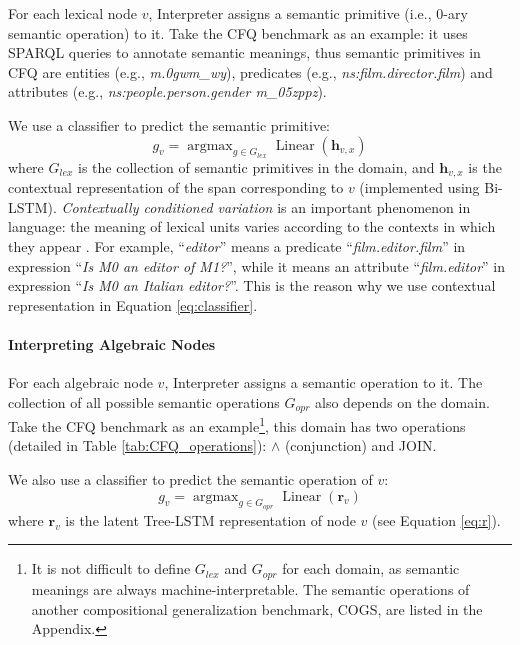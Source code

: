 \documentclass[11pt,a4paper]{article}
\begin{document}
For each lexical node $v$, Interpreter assigns a semantic primitive (i.e., $0$-ary semantic operation) to it.
Take the CFQ benchmark as an example:
it uses SPARQL queries to annotate semantic meanings, thus semantic primitives in CFQ are entities (e.g., \textit{m.0gwm\_wy}), predicates (e.g., \textit{ns:film.director.film}) and attributes (e.g., \textit{ns:people.person.gender m\_05zppz}).

We use a classifier to predict the semantic primitive:
\begin{equation}\label{eq:classifier}
g_v = \mathop{\arg\max}_{g\in G_{lex}}\operatorname{Linear}(\mathbf{h}_{v, x})
\end{equation}
where $G_{lex}$ is the collection of semantic primitives in the domain, and $\mathbf{h}_{v, x}$ is the contextual representation of the span corresponding to $v$ (implemented using Bi-LSTM).
\textit{Contextually conditioned variation} is an important phenomenon in language: the meaning of lexical units varies according to the contexts in which they appear \cite{allwood2003meaning-ccv}.
For example, ``\emph{editor}'' means a predicate ``\emph{film.editor.film}'' in expression ``\emph{Is M0 an editor of M1?}'', while it means an attribute ``\emph{film.editor}'' in expression ``\emph{Is M0 an Italian editor?}''.
This is the reason why we use contextual representation in Equation \ref{eq:classifier}.

\paragraph{Interpreting Algebraic Nodes}

For each algebraic node $v$, Interpreter assigns a semantic operation to it.
The collection of all possible semantic operations $G_{opr}$ also depends on the domain.
Take the CFQ benchmark as an example\footnote{It is not difficult to define $G_{lex}$ and $G_{opr}$ for each domain, as semantic meanings are always machine-interpretable. The semantic operations of another compositional generalization benchmark, COGS, are listed in the Appendix.}, this domain has two operations (detailed in Table \ref{tab:CFQ_operations}): $\wedge$ (conjunction) and JOIN.

We also use a classifier to predict the semantic operation of $v$:
\begin{equation}\label{eq:opr}
g_v = \mathop{\arg\max}_{g\in G_{opr}}\operatorname{Linear}(\mathbf{r}_v)
\end{equation}
where $\mathbf{r}_v$ is the latent Tree-LSTM representation of node $v$ (see Equation \ref{eq:r}).
\end{document}
